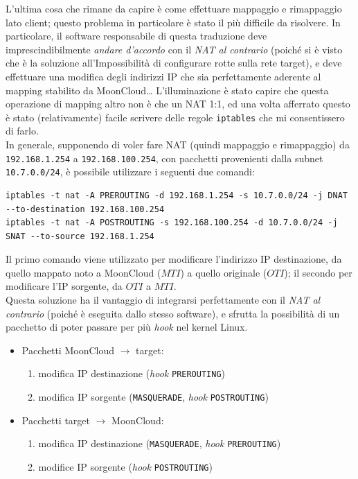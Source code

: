 L'ultima cosa che rimane da capire è come effettuare mappaggio e rimappaggio lato client;
questo problema in particolare è stato il più difficile da risolvere.
In particolare, il software responsabile di questa traduzione deve imprescindibilmente
\textit{andare d'accordo} con il \textit{NAT al contrario} (poiché si è visto che
è la soluzione all'Impossibilità di configurare rotte sulla rete target), e deve effettuare
una modifica degli indirizzi IP che sia perfettamente aderente al mapping stabilito
da MoonCloud\ldots
L'illuminazione è stato capire che questa operazione di mapping altro non è che un
NAT 1:1, ed una volta afferrato questo è stato (relativamente) facile scrivere delle
regole \texttt{iptables} che mi consentissero di farlo.\\
In generale, supponendo di voler fare NAT (quindi mappaggio e rimappaggio) da
\texttt{192.168.1.254} a \texttt{192.168.100.254},
con pacchetti provenienti dalla subnet \texttt{10.7.0.0/24}, è possibile
utilizzare i seguenti
due comandi:
\begin{verbatim}
iptables -t nat -A PREROUTING -d 192.168.1.254 -s 10.7.0.0/24 -j DNAT --to-destination 192.168.100.254
iptables -t nat -A POSTROUTING -s 192.168.100.254 -d 10.7.0.0/24 -j SNAT --to-source 192.168.1.254
\end{verbatim}
Il primo comando viene utilizzato per modificare l'indirizzo IP destinazione,
da quello mappato noto a MoonCloud ($MTI$) a quello originale ($OTI$); il secondo
per modificare l'IP sorgente, da $OTI$ a $MTI$.\\
Questa soluzione ha il vantaggio di integrarsi perfettamente con il \textit{NAT
al contrario} (poiché è eseguita dallo stesso software), e sfrutta la
possibilità di un pacchetto di poter passare per più \textit{hook}
nel kernel Linux.
\begin{itemize}
  \item Pacchetti MoonCloud $\rightarrow$ target:
  \begin{enumerate}
    \item modifica IP destinazione (\textit{hook} \texttt{PREROUTING})
    \item modifica IP sorgente (\texttt{MASQUERADE}, \textit{hook}
    \texttt{POSTROUTING})
  \end{enumerate}
  \item Pacchetti target $\rightarrow$ MoonCloud:
  \begin{enumerate}
    \item modifica IP destinazione (\texttt{MASQUERADE}, \textit{hook}
    \texttt{PREROUTING})
    \item modifice IP sorgente (\textit{hook} \texttt{POSTROUTING})
  \end{enumerate}
\end{itemize}

